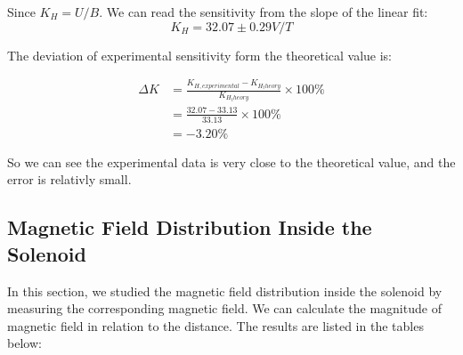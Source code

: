 \documentclass[12pt, a4paper]{article}
\begin{document}
Since $K_H = U/B$. We can read the sensitivity from the slope of the linear fit:
$$
K_H = 32.07\pm0.29V/T
$$

The deviation of experimental sensitivity form the theoretical value is:

\begin{align*}
	\Delta K &= \frac{K_{H,experimental} - K_{H_theory}}{K_{H_theory}} \times 100\%\\
			 &= \frac{32.07-33.13}{33.13} \times 100\%\\
			 &= -3.20\% 
\end{align*}

So we can see the experimental data is very close to the theoretical value, and the error is relativly small.

\subsection{Magnetic Field Distribution Inside the Solenoid}
In this section, we studied the magnetic field distribution inside the solenoid by measuring the corresponding
magnetic field. We can calculate the magnitude of magnetic field in relation to the distance. The results are listed 
in the tables below:
\end{document}
